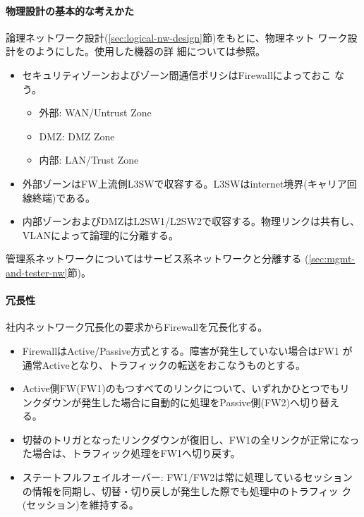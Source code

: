     \paragraph{物理設計の基本的な考えかた}
論理ネットワーク設計(\ref{sec:logical-nw-design}節)をもとに、物理ネット
ワーク設計をのようにした。使用した機器の詳
細については参照。
\begin{itemize}
 \item セキュリティゾーンおよびゾーン間通信ポリシはFirewallによっておこ
       なう。
       \begin{itemize}
        \item 外部: WAN/Untrust Zone
        \item DMZ: DMZ Zone
        \item 内部: LAN/Trust Zone
       \end{itemize}
 \item 外部ゾーンはFW上流側L3SWで収容する。L3SWはinternet境界(キャリア回
       線終端)である。
 \item 内部ゾーンおよびDMZはL2SW1/L2SW2で収容する。物理リンクは共有し、
       VLANによって論理的に分離する。
\end{itemize}

管理系ネットワークについてはサービス系ネットワークと分離する
(\ref{sec:mgmt-and-tester-nw}節)。

    \paragraph{冗長性}

社内ネットワーク冗長化の要求からFirewallを冗長化する。
\begin{itemize}
 \item FirewallはActive/Passive方式とする。障害が発生していない場合はFW1
       が通常Activeとなり、トラフィックの転送をおこなうものとする。
 \item Active側FW(FW1)のもつすべてのリンクについて、いずれかひとつでもリ
       ンクダウンが発生した場合に自動的に処理をPassive側(FW2)へ切り替え
       る。
 \item 切替のトリガとなったリンクダウンが復旧し、FW1の全リンクが正常になっ
       た場合は、トラフィック処理をFW1へ切り戻す。
 \item ステートフルフェイルオーバー: FW1/FW2は常に処理しているセッション
       の情報を同期し、切替・切り戻しが発生した際でも処理中のトラフィッ
       ク(セッション)を維持する。
\end{itemize}

